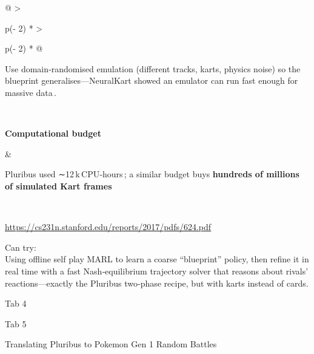 \documentclass[
]{article}
\begin{document}
\begin{longtable}[]{@{}
  >{\raggedright\arraybackslash}p{(\columnwidth - 2\tabcolsep) * }
  >{\raggedright\arraybackslash}p{(\columnwidth - 2\tabcolsep) * }@{}}
\begin{minipage}[b]{\linewidth}
Use domain‑randomised emulation (different tracks, karts, physics noise)
so the blueprint generalises---NeuralKart showed an emulator can run
fast enough for massive data\,.
\end{minipage} \\
\begin{minipage}[b]{\linewidth}\raggedright
\textbf{Computational budget}
\end{minipage} & \begin{minipage}[b]{\linewidth}\raggedright
Pluribus used ∼12\,k\,CPU‑hours\,; a similar budget buys
\textbf{hundreds of millions of simulated Kart frames}
\end{minipage} \\
\midrule\noalign{}
\endhead
\bottomrule\noalign{}
\endlastfoot
\end{longtable}

\href{https://cs231n.stanford.edu/reports/2017/pdfs/624.pdf}{\ul{https://cs231n.stanford.edu/reports/2017/pdfs/624.pdf}}

Can try:\\
Using offline self play MARL to learn a coarse ``blueprint'' policy,
then refine it in real time with a fast Nash‑equilibrium trajectory
solver that reasons about rivals' reactions---exactly the Pluribus
two‑phase recipe, but with karts instead of cards.

Tab 4

Tab 5

Translating Pluribus to Pokemon Gen 1 Random Battles
\end{document}
